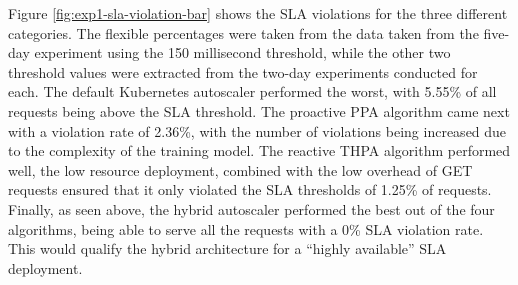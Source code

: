 \begin{center}
\begin{minipage}{\linewidth}
    \label{fig:exp1-sla-violation-bar}
\end{minipage}
\end{center}

Figure \ref{fig:exp1-sla-violation-bar} shows the SLA violations for the three different categories. The flexible percentages were taken from the data taken from the five-day experiment using the 150 millisecond threshold, while the other two threshold values were extracted from the two-day experiments conducted for each. The default Kubernetes autoscaler performed the worst, with 5.55\% of all requests being above the SLA threshold. The proactive PPA algorithm came next with a violation rate of 2.36\%, with the number of violations being increased due to the complexity of the training model. The reactive THPA algorithm performed well, the low resource deployment, combined with the low overhead of GET requests ensured that it only violated the SLA thresholds of 1.25\% of requests. Finally, as seen above, the hybrid autoscaler performed the best out of the four algorithms, being able to serve all the requests with a 0\% SLA violation rate. This would qualify the hybrid architecture for a ``highly available'' SLA deployment.\par

